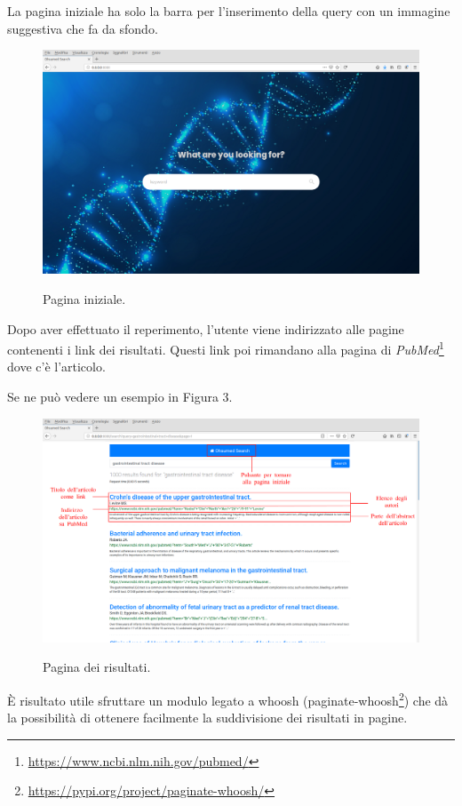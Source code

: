 \documentclass[runningheads]{llncs}
\begin{document}
La pagina iniziale ha solo la barra per l'inserimento della query con un immagine suggestiva che fa da sfondo. 
\begin{figure}%
    \centering
    {{\includegraphics[width=1\linewidth]{index} }}%
    \caption{Pagina iniziale.}%
\end{figure}
Dopo aver effettuato il reperimento, l'utente viene indirizzato alle pagine contenenti
i link dei risultati.
Questi link poi rimandano alla pagina di \emph{PubMed}\footnote{\url{https://www.ncbi.nlm.nih.gov/pubmed/}} dove c'\`e l'articolo.

Se ne pu\`o vedere un esempio in Figura 3.

\begin{figure}%
    \centering
    {{\includegraphics[width=1\linewidth]{risultati} }}%
    \caption{Pagina dei risultati.}%
\end{figure}

\`E risultato utile sfruttare un modulo legato a whoosh (paginate-whoosh\footnote{\url{https://pypi.org/project/paginate-whoosh/}})
che d\`a la possibilit\`a di ottenere facilmente la suddivisione dei risultati in pagine.
\end{document}
